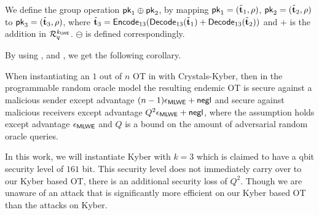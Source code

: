 We define the group operation $\mathsf{pk}_1\oplus\mathsf{pk}_2$, by mapping $\mathsf{pk}_1=(\tilde{{\mathbf t}}_1,\rho)$, $\mathsf{pk}_2=(\tilde{{\mathbf t}}_2,\rho)$ to $\mathsf{pk}_3=(\tilde{{\mathbf t}}_3, \rho)$, where $\tilde{{\mathbf t}}_3=\mathsf{Encode}_{13}(\mathsf{Decode}_{13}(\tilde{{\mathbf t}}_1)+\mathsf{Decode}_{13}(\tilde{{\mathbf t}}_2))$ and $+$ is the addition in $\mathcal R_q^{k_{\mathsf{LWE}}}$. $\ominus$ is defined correspondingly. 

By using ,  and , we get the following corollary.
 
\begin{corollary}
When instantiating an $1$ out of $n$ OT in  with Crystals-Kyber, then in the programmable random oracle model the resulting endemic OT is secure against a malicious sender except advantage $(n-1)\epsilon_{\mathsf{MLWE}}+\mathsf{negl}$  and secure against malicious receivers except advantage $Q^2\epsilon_{\mathsf{MLWE}}+\mathsf{negl}$, where the \MLWE assumption holds except advantage $\epsilon_{\mathsf{MLWE}}$ and $Q$ is a bound on the amount of adversarial random oracle queries.
\end{corollary}

In this work, we will instantiate Kyber with $k=3$ which is claimed to have a qbit security level of $161$ bit. This security level does not immediately carry over to our Kyber based OT, there is an additional security loss of $Q^2$. Though we are unaware of an attack that is significantly more efficient on our Kyber based OT than the attacks on Kyber.